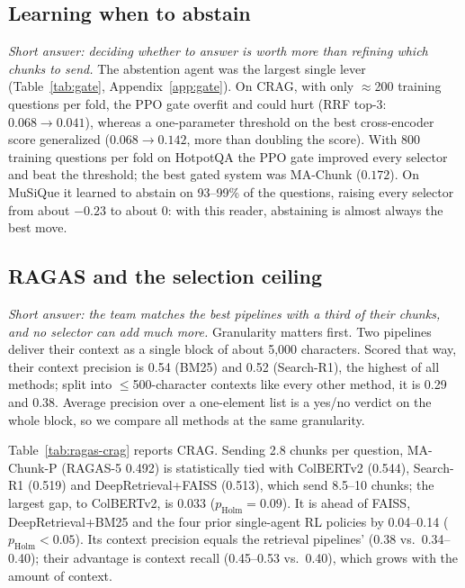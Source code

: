 \documentclass[sigconf,anonymous]{aamas}
\newcommand{\method}{MA-Chunk}
\theoremstyle{plain}
\theoremstyle{definition}
\begin{document}
\subsection{Learning when to abstain}

\emph{Short answer: deciding whether to answer is worth more than refining which chunks to send.} The abstention agent was the largest single lever (Table~\ref{tab:gate}, Appendix~\ref{app:gate}). On CRAG, with only $\approx$200 training questions per fold, the PPO gate overfit and could hurt (RRF top-3: $0.068\to0.041$), whereas a one-parameter threshold on the best cross-encoder score generalized ($0.068\to0.142$, more than doubling the score). With 800 training questions per fold on HotpotQA the PPO gate improved every selector and beat the threshold; the best gated system was \method{} ($0.172$). On MuSiQue it learned to abstain on 93--99\% of the questions, raising every selector from about $-0.23$ to about $0$: with this reader, abstaining is almost always the best move.



\subsection{RAGAS and the selection ceiling}\label{sec:ragas}

\emph{Short answer: the team matches the best pipelines with a third of their chunks, and no selector can add much more.} Granularity matters first. Two pipelines deliver their context as a single block of about 5{,}000 characters. Scored that way, their context precision is 0.54 (BM25) and 0.52 (Search-R1), the highest of all methods; split into $\le$500-character contexts like every other method, it is 0.29 and 0.38. Average precision over a one-element list is a yes/no verdict on the whole block, so we compare all methods at the same granularity.

Table~\ref{tab:ragas-crag} reports CRAG. Sending 2.8 chunks per question, MA-Chunk-P (RAGAS-5 0.492) is statistically tied with ColBERTv2 (0.544), Search-R1 (0.519) and DeepRetrieval+FAISS (0.513), which send 8.5--10 chunks; the largest gap, to ColBERTv2, is $0.033$ ($p_{\mathrm{Holm}}=0.09$). It is ahead of FAISS, DeepRetrieval+BM25 and the four prior single-agent RL policies by 0.04--0.14 ($p_{\mathrm{Holm}}<0.05$). Its context precision equals the retrieval pipelines' (0.38 vs.\ 0.34--0.40); their advantage is context recall (0.45--0.53 vs.\ 0.40), which grows with the amount of context.
\end{document}
